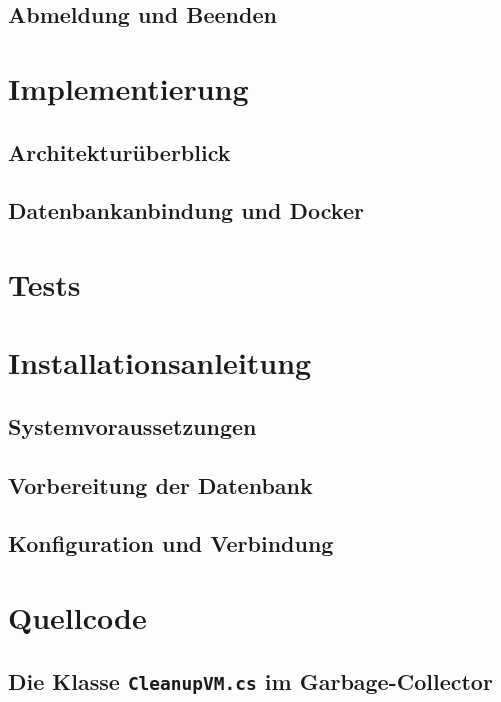 \documentclass[12pt,a4paper]{article}
\begin{document}
\subsection{Abmeldung und Beenden}



\section{Implementierung}
\subsection{Architekturüberblick}


\subsection{Datenbankanbindung und Docker}


\section{Tests}


\section{Installationsanleitung}
\subsection{Systemvoraussetzungen}


\subsection{Vorbereitung der Datenbank}


\subsection{Konfiguration und Verbindung}



\section{Quellcode}
\subsection{Die Klasse \texttt{CleanupVM.cs} im Garbage-Collector}
\end{document}
